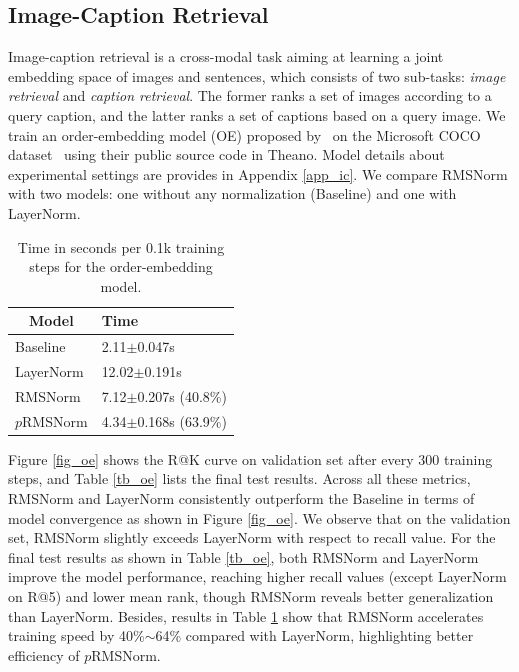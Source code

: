 \documentclass{article}
\begin{document}
\subsection{Image-Caption Retrieval}

Image-caption retrieval is a cross-modal task aiming at learning a joint embedding space of images and sentences, which consists of two sub-tasks: \textit{image retrieval} and \textit{caption retrieval}. The former ranks a set of images according to a query caption, and the latter ranks a set of captions based on a query image. We train an order-embedding model (OE) proposed by~\citet{vendrov2015order} on the Microsoft COCO dataset~\cite{lin2014microsoft} using their public source code in Theano.
Model details about experimental settings are provides in Appendix \ref{app_ic}. We compare RMSNorm with two models: one without any normalization (Baseline) and one with LayerNorm.

\begin{table}
  \vspace{-0.25in}
\footnotesize
\centering
\begin{tabular}{l|l}
\multicolumn{1}{c|}{Model} & Time \\
\hline
\hline
 Baseline & \phantom{0}2.11$\pm$0.047s \\
 LayerNorm & 12.02$\pm$0.191s\\
\hline
 RMSNorm & \phantom{0}7.12$\pm$0.207s ({40.8\%}) \\
 $p$RMSNorm & \phantom{0}4.34$\pm$0.168s (63.9\%)
\end{tabular}
\caption{\label{tb_oe_time} Time in seconds per 0.1k training steps for the order-embedding model.} 
\vspace{-0.15in}
\end{table}
Figure \ref{fig_oe} shows the R@K curve on validation set after every 300 training steps, and Table \ref{tb_oe} lists the final test results. Across all these metrics, RMSNorm and LayerNorm consistently outperform the Baseline in terms of model convergence as shown in Figure \ref{fig_oe}. We observe that on the validation set, RMSNorm slightly exceeds LayerNorm with respect to recall value. For the final test results as shown in Table \ref{tb_oe}, both RMSNorm and LayerNorm improve the model performance, reaching higher recall values (except LayerNorm on R@5) and lower mean rank, though RMSNorm reveals better generalization than LayerNorm. Besides, results in Table \ref{tb_oe_time} show that RMSNorm accelerates training speed by 40\%$\sim$64\% compared with LayerNorm, highlighting better efficiency of $p$RMSNorm.
\end{document}

